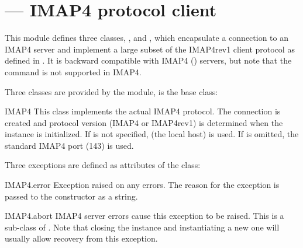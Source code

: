 \section{ ---
         IMAP4 protocol client}




This module defines three classes, ,  and , which encapsulate a
connection to an IMAP4 server and implement a large subset of the
IMAP4rev1 client protocol as defined in . It is backward
compatible with IMAP4 () servers, but note that the
 command is not supported in IMAP4.

Three classes are provided by the  module,  is the base class:

\begin{classdesc}{IMAP4}{}
This class implements the actual IMAP4 protocol.  The connection is
created and protocol version (IMAP4 or IMAP4rev1) is determined when
the instance is initialized.
If  is not specified,  (the local host) is used.
If  is omitted, the standard IMAP4 port (143) is used.
\end{classdesc}

Three exceptions are defined as attributes of the  class:

\begin{excdesc}{IMAP4.error}
Exception raised on any errors.  The reason for the exception is
passed to the constructor as a string.
\end{excdesc}

\begin{excdesc}{IMAP4.abort}
IMAP4 server errors cause this exception to be raised.  This is a
sub-class of .  Note that closing the instance
and instantiating a new one will usually allow recovery from this
exception.
\end{excdesc}

